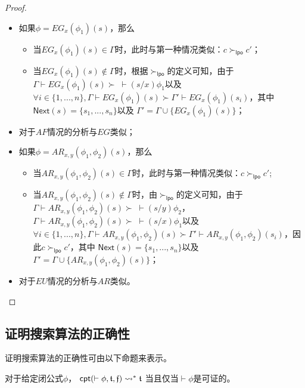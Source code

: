 \begin{proof}
\begin{itemize}
		\item 如果$\phi = EG_x(\phi_1)(s)$，那么
		\begin{itemize}
			\item 当$EG_x(\phi_1)(s)\in \Gamma$时，此时与第一种情况类似：$c\succ_{\mathsf{lpo}}c'$；
			\item 当$EG_x(\phi_1)(s)\not\in \Gamma$时，根据$\succ_{\mathsf{lpo}}$的定义可知，由于$\Gamma\vdash EG_x(\phi_1)(s) \succ \;\vdash(s/x)\phi_1$以及$\forall i\in\{1,...,n\}, \Gamma\vdash EG_x(\phi_1)(s) \succ \Gamma'\vdash EG_x(\phi_1)(s_i)$，其中$\textsf{Next}(s)=\{s_1,...,s_n\}$以及 $\Gamma'=\Gamma\cup\{EG_x(\phi_1)(s)\}$；
		\end{itemize}
		\item 对于$AF$情况的分析与$EG$类似；
		\item 如果$\phi = AR_{x,y}(\phi_1,\phi_2)(s)$，那么
		\begin{itemize}
			\item 当$AR_{x,y}(\phi_1,\phi_2)(s) \in \Gamma$时，此时与第一种情况类似：$c\succ_{\mathsf{lpo}}c'$;
			\item 当$AR_{x,y}(\phi_1,\phi_2)(s) \notin \Gamma$时，由$\succ_{\mathsf{lpo}}$的定义可知，由于$\Gamma\vdash AR_{x,y}(\phi_1,\phi_2)(s) \succ \;\vdash (s/y)\phi_2$， $\Gamma\vdash AR_{x,y}(\phi_1,\phi_2)(s) \succ \;\vdash (s/x)\phi_1$以及$\forall i\in\{1,...,n\}, \Gamma\vdash AR_{x,y}(\phi_1,\phi_2)(s) \succ \Gamma'\vdash AR_{x,y}(\phi_1,\phi_2)(s_i)$，因此$c\succ_{\mathsf{lpo}} c'$，其中 $\textsf{Next}(s)=\{s_1,...,s_n\}$以及 $\Gamma'=\Gamma\cup\{AR_{x,y}(\phi_1,\phi_2)(s)\}$；
		\end{itemize}
		\item 对于$EU$情况的分析与$AR$类似。
	\end{itemize}
\end{proof}


\subsection{证明搜索算法的正确性}\label{subsec:cpt:correctness}
证明搜索算法的正确性可由以下命题来表示。
\begin{proposition}[证明搜索算法的正确性]
	对于给定闭公式$\phi$， 
	$\textsf{cpt}(\vdash\phi, \mathfrak{t}, \mathfrak{f}) \rightsquigarrow^* \mathfrak{t}$ 当且仅当$\vdash \phi$是可证的。
\end{proposition}

